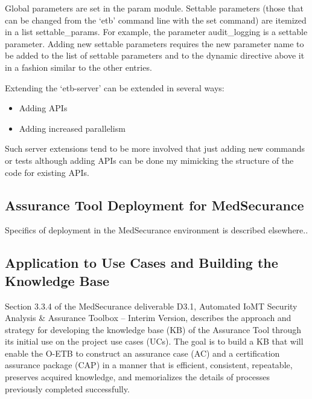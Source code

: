 \documentclass[12pt,twoside,a4paper]{article}
\begin{document}
Global parameters are set in the param module. Settable parameters (those that can be changed from the `etb' command line with the set command) are itemized in a list settable\_params. For example, the parameter audit\_logging is a settable parameter. Adding new settable parameters requires the new parameter name to be added to the list of settable parameters and to the dynamic directive above it in a fashion similar to the other entries.

Extending the `etb-server' can be extended in several ways:

\begin{itemize}
\item
  Adding APIs
\item
  Adding increased parallelism
\end{itemize}

Such server extensions tend to be more involved that just adding new commands or tests although adding APIs can be done my mimicking the structure of the code for existing APIs.

\hypertarget{assurance-tool-deployment-for-medsecurance}{%
\subsection{Assurance Tool Deployment for MedSecurance}\label{assurance-tool-deployment-for-medsecurance}}

Specifics of deployment in the MedSecurance environment is described elsewhere..

\hypertarget{application-to-use-cases-and-building-the-knowledge-base}{%
\subsection{Application to Use Cases and Building the Knowledge Base}\label{application-to-use-cases-and-building-the-knowledge-base}}

Section 3.3.4 of the MedSecurance deliverable D3.1, Automated IoMT Security Analysis \& Assurance Toolbox -- Interim Version, describes the approach and strategy for developing the knowledge base (KB) of the Assurance Tool through its initial use on the project use cases (UCs). The goal is to build a KB that will enable the O-ETB to construct an assurance case (AC) and a certification assurance package (CAP) in a manner that is efficient, consistent, repeatable, preserves acquired knowledge, and memorializes the details of processes previously completed successfully.
\end{document}
